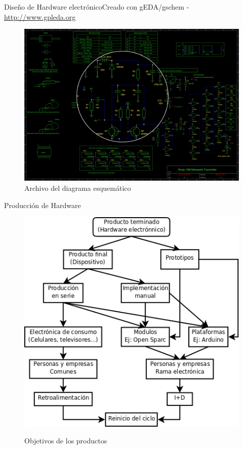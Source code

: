 \documentclass{beamer}
\begin{document}
\begin{frame}{Diseño de Hardware electrónico}{Creado con \alert{gEDA/gschem} - \url{http://www.gpleda.org}}
  \begin{figure}
    \includegraphics[scale=0.21]{transmisor/transmisor_esquema}
    \caption{Archivo del diagrama esquemático}
  \end{figure}
\end{frame}

\begin{frame}{Producción de Hardware}
  \begin{figure}
    \includegraphics[scale=0.3]{img/objetivos}
    \label{fig:objetivos}
    \caption{Objetivos de los productos}
  \end{figure}
\end{frame}
 
\end{document}
